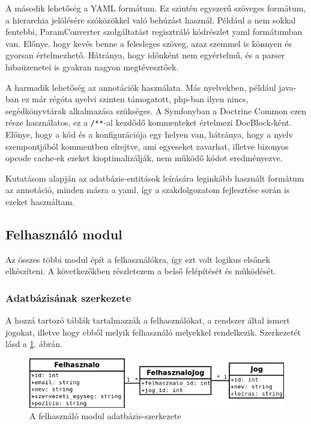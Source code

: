 \documentclass[a4paper,12pt,oneside]{report}
\begin{document}
A második lehetőség a YAML formátum. Ez szintén egyszerű szöveges formátum, a hierarchia jelölésére szóközökkel való behúzást használ. Például a nem sokkal fentebbi, ParamConverter szolgáltatást regisztráló kódrészlet yaml formátumban van. Előnye, hogy kevés benne a felesleges szöveg, azaz szemmel is könnyen és gyorsan értelmezhető. Hátránya, hogy időnként nem egyértelmű, és a parser hibaüzenetei is gyakran nagyon megtévesztőek.

A harmadik lehetőség az annotációk használata. Más nyelvekben, például java-ban ez már régóta nyelvi szinten támogatott, php-ban ilyen nincs, segédkönyvtárak alkalmazása szükséges. A Symfonyban a Doctrine Common ezen része használatos, ez a \lstinline!/**!-al kezdődő kommenteket értelmezi DocBlock-ként. Előnye, hogy a kód és a konfigurációja egy helyen van, hátránya, hogy a nyelv szempontjából kommentben elrejtve, ami egyeseket zavarhat, illetve bizonyos opcode cache-ek ezeket kioptimalizálják, nem működő kódot eredményezve.

Kutatásom alapján az adatbázis-entitások leírására leginkább használt formátum az annotáció, minden másra a yaml, így a szakdolgozatom fejlesztése során is ezeket használtam.

\subsection{Felhasználó modul}

Az összes többi modul épít a felhasználókra, így ezt volt logikus elsőnek elkészíteni. A következőkben részletezem a belső felépítését és működését.

\subsubsection*{Adatbázisának szerkezete}

A hozzá tartozó táblák tartalmazzák a felhasználókat, a rendszer által ismert jogokat, illetve hogy ebből melyik felhasználó melyekkel rendelkezik. Szerkezetét lásd a \ref{fig:felhasznalo_db}. ábrán.

\begin{figure}[h]
  \includegraphics[width=\textwidth]{felhasznalo_db.png}
  \caption{A felhasználó modul adatbázis-szerkezete}
  \label{fig:felhasznalo_db}
\end{figure}
\end{document}
